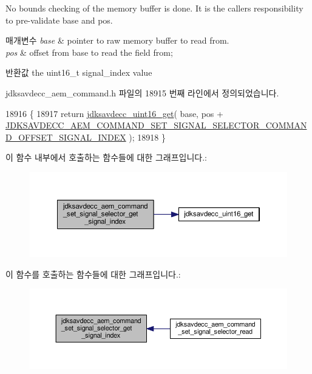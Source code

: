 No bounds checking of the memory buffer is done. It is the caller\textquotesingle{}s responsibility to pre-\/validate base and pos.


\begin{DoxyParams}{매개변수}
{\em base} & pointer to raw memory buffer to read from. \\
\hline
{\em pos} & offset from base to read the field from; \\
\hline
\end{DoxyParams}
\begin{DoxyReturn}{반환값}
the uint16\+\_\+t signal\+\_\+index value 
\end{DoxyReturn}


jdksavdecc\+\_\+aem\+\_\+command.\+h 파일의 18915 번째 라인에서 정의되었습니다.


\begin{DoxyCode}
18916 \{
18917     \textcolor{keywordflow}{return} \hyperlink{group__endian_ga3fbbbc20be954aa61e039872965b0dc9}{jdksavdecc\_uint16\_get}( base, pos + 
      \hyperlink{group__command__set__signal__selector_ga4112880d653cb524237e550d00770fb7}{JDKSAVDECC\_AEM\_COMMAND\_SET\_SIGNAL\_SELECTOR\_COMMAND\_OFFSET\_SIGNAL\_INDEX}
       );
18918 \}
\end{DoxyCode}


이 함수 내부에서 호출하는 함수들에 대한 그래프입니다.\+:
\nopagebreak
\begin{figure}[H]
\begin{center}
\leavevmode
\includegraphics[width=350pt]{group__command__set__signal__selector_gad129f712cf56b197817fc8db6afeeabe_cgraph}
\end{center}
\end{figure}




이 함수를 호출하는 함수들에 대한 그래프입니다.\+:
\nopagebreak
\begin{figure}[H]
\begin{center}
\leavevmode
\includegraphics[width=350pt]{group__command__set__signal__selector_gad129f712cf56b197817fc8db6afeeabe_icgraph}
\end{center}
\end{figure}


